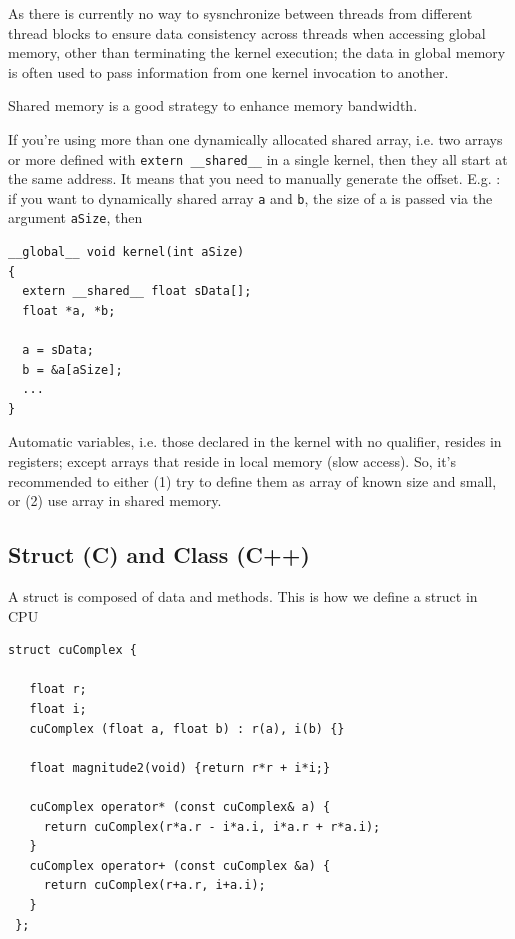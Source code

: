 \begin{framed}
  As there is currently no way to sysnchronize between threads from
  different thread blocks to ensure data consistency across threads
  when accessing global memory, other than terminating the kernel
  execution; the data in global memory is often used to pass
  information from one kernel invocation to another. 

  Shared memory is a good strategy to enhance memory bandwidth.
\end{framed}

\begin{framed}
  If you're using more than one dynamically allocated shared array,
  i.e. two arrays or more defined with \verb!extern __shared__! in a
  single kernel, then they all start at the same address. It means
  that you need to manually generate the offset. E.g. : if you want to
  dynamically shared array \verb!a! and \verb!b!, the size of a is
  passed via the argument \verb!aSize!, then
\begin{lstlisting}
__global__ void kernel(int aSize)
{
  extern __shared__ float sData[];
  float *a, *b;

  a = sData;
  b = &a[aSize];
  ...
}
\end{lstlisting}
\end{framed}


\begin{framed}
  Automatic variables, i.e. those declared in the kernel with no
  qualifier, resides in registers; except arrays that reside in local
  memory (slow access). So, it's recommended to either (1) try to
  define them as array of known size and small, or (2) use array in
  shared memory. 
\end{framed}



\subsection{Struct (C) and Class (C++)}
\label{sec:gpu_struct}
\label{sec:gpu_class}
\label{sec:CUDA_class}

A struct is composed of data and methods. This is how we define a struct in CPU
\begin{lstlisting}
struct cuComplex {

   float r;
   float i;
   cuComplex (float a, float b) : r(a), i(b) {}
   
   float magnitude2(void) {return r*r + i*i;}
   
   cuComplex operator* (const cuComplex& a) {
     return cuComplex(r*a.r - i*a.i, i*a.r + r*a.i);
   }
   cuComplex operator+ (const cuComplex &a) {
     return cuComplex(r+a.r, i+a.i);
   }
 };
\end{lstlisting}

